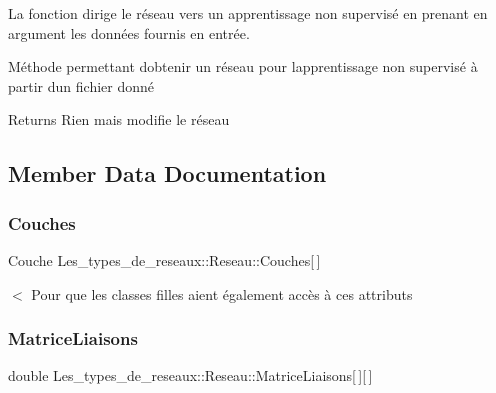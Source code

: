 La fonction dirige le réseau vers un apprentissage non supervisé en prenant en argument les données fournis en entrée. 

Méthode permettant d\textquotesingle{}obtenir un réseau pour l\textquotesingle{}apprentissage non supervisé à partir d\textquotesingle{}un fichier donné

\begin{DoxyReturn}{Returns}
Rien mais modifie le réseau 
\end{DoxyReturn}


\subsection{Member Data Documentation}
\mbox{\label{class_les__types__de__reseaux_1_1_reseau_a5f2f8b87a174fbb7f8f886815adc8728}} 
\subsubsection{\texorpdfstring{Couches}{Couches}}
{\footnotesize\ttfamily Couche Les\+\_\+types\+\_\+de\+\_\+reseaux\+::\+Reseau\+::\+Couches\mbox{[}$\,$\mbox{]}\hspace{0.3cm}{\ttfamily [protected]}}

$<$ Pour que les classes filles aient également accès à ces attributs \mbox{\label{class_les__types__de__reseaux_1_1_reseau_a8bbb482e67d52743d91d99912a8ad373}} 
\subsubsection{\texorpdfstring{Matrice\+Liaisons}{MatriceLiaisons}}
{\footnotesize\ttfamily double Les\+\_\+types\+\_\+de\+\_\+reseaux\+::\+Reseau\+::\+Matrice\+Liaisons\mbox{[}$\,$\mbox{]}\mbox{[}$\,$\mbox{]}\hspace{0.3cm}{\ttfamily [protected]}}

